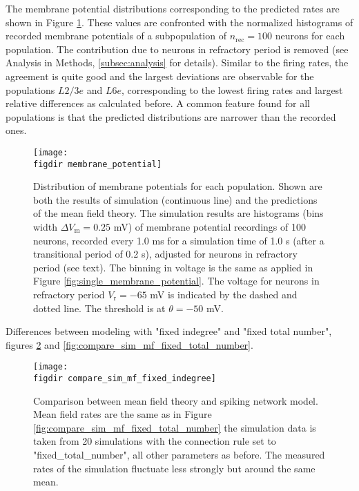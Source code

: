 The membrane potential distributions corresponding to the predicted rates are
shown in Figure \ref{fig:membrane_potential}. 
These values are confronted with the normalized histograms of recorded 
membrane potentials of a subpopulation of $n_\text{rec} = 100$ neurons for 
each population. The contribution due to neurons in refractory period is removed
(see Analysis in Methods, \ref{subsec:analysis} for details). 
Similar to the firing rates, 
the agreement is quite good and the largest deviations are observable for  
the populations $L2/3e$ and $L6e$, corresponding to the lowest firing rates and
largest relative differences as calculated before. A common feature found for all
populations is that the predicted distributions are narrower than the recorded ones. 


\begin{figure}[htpb]
    \centering
    \texttt{[image: \\figdir membrane\_potential]}
    \caption{
        Distribution of membrane potentials for each population. 
        Shown are both the results of simulation (continuous line) and 
        the predictions of the mean field theory. The simulation results 
        are histograms (bins width $\Delta V_\text{m} = 0.25$ mV) 
        of membrane potential recordings 
        of 100 neurons, recorded every 1.0 ms for a simulation time of 1.0 s 
        (after a transitional period of 0.2 s), 
        adjusted for neurons in refractory period (see text). 
        The binning in voltage is the same as applied in Figure 
        \ref{fig:single_membrane_potential}. 
        The voltage for neurons in refractory period $V_\text{r} = -65$ mV 
        is indicated by the dashed and dotted line. The threshold is at 
        $\theta = -50$ mV. 
    }
    \label{fig:membrane_potential}
\end{figure}



Differences between modeling with "fixed indegree" and "fixed total number",
figures \ref{fig:compare_sim_mf_fixed_indegree} and 
\ref{fig:compare_sim_mf_fixed_total_number}.

\begin{figure}[htpb]
    \centering
    \texttt{[image: \\figdir compare\_sim\_mf\_fixed\_indegree]}
    \caption{
        Comparison between mean field theory and spiking network model.
        Mean field rates are the same as in Figure 
        \ref{fig:compare_sim_mf_fixed_total_number} the simulation data is 
        taken from 20 simulations with the connection 
        rule set to "fixed\_total\_number", all other parameters as before.
        The measured rates of the simulation 
        fluctuate less strongly but around the same mean. 
    }
    \label{fig:compare_sim_mf_fixed_indegree}
\end{figure}


